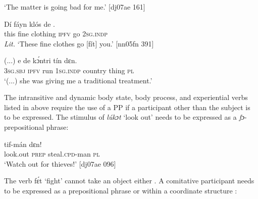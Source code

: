 \glt ‘The matter is going bad for me.’ [dj07ae 161]
\z


\ea%
    \label{ex:key:1086}
    \gll Dí  fáyn    klós    de    .\\
this  fine  clothing    \textsc{ipfv}  go  \textsc{2sg.indp}\\

\glt \textit{Lit.} ‘These fine clothes go [fít] you.’ [nn05fn 391]
\z


\ea%
    \label{ex:key:1087}
    \gll (...)  e    de        kɔ́ntri  tín    dɛn.\\
  {} \textsc{3sg.sbj}  \textsc{ipfv}  run  \textsc{1sg.indp}  country  thing  \textsc{pl}\\

\glt ‘(...) she was giving me a traditional treatment.’ 


\z

The intransitive and dynamic body state, body process, and experiential verbs listed in  above require the use of a PP if a participant other than the subject is to be expressed. The stimulus of \textit{lúkɔt} ‘look out’ needs to be expressed as a \textit{fɔ}{}-prepositional phrase: 


\z


\ea%
    \label{ex:key:1089}
    \gll {}   tif-mán      dɛn!\\
look.out  \textsc{prep}  steal\textsc{.cpd}{}-man    \textsc{pl}\\

\glt ‘Watch out for thieves!’ [dj07ae 096]
\z

The verb fɛ́t ‘fight’ cannot take an object either . A comitative participant needs to be expressed as a prepositional phrase  or within a coordinate structure :


\z


